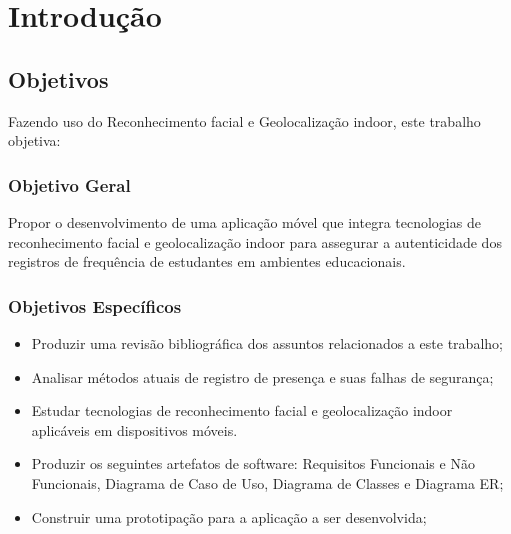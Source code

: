 
\chapter{Introdução}\label{ch:intro}


\section{Objetivos}\label{sec:objetivos}
Fazendo uso do Reconhecimento facial e Geolocalização indoor, este trabalho objetiva:

\subsection{Objetivo Geral}\label{subsec:objetivo-geral}
Propor o desenvolvimento de uma aplicação móvel que integra tecnologias de reconhecimento facial e geolocalização indoor para assegurar a autenticidade dos registros de frequência de estudantes em ambientes educacionais.

\subsection{Objetivos Específicos}\label{subsec:objetivos-especificos}
\begin{itemize}

    \item Produzir uma revisão bibliográfica dos assuntos relacionados a este trabalho;
    \item Analisar métodos atuais de registro de presença e suas falhas de segurança;
    \item Estudar tecnologias de reconhecimento facial e geolocalização indoor aplicáveis em dispositivos móveis.
    \item Produzir os seguintes artefatos de software: Requisitos Funcionais e Não Funcionais, Diagrama de Caso de Uso, Diagrama de Classes e Diagrama ER;
    \item Construir uma prototipação para a aplicação a ser desenvolvida;

\end{itemize}
